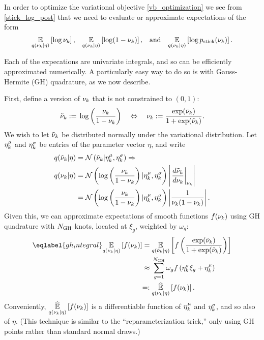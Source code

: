 In order to optimize the variational objective \eqref{vb_optimization} we see
from \eqref{stick_log_post} that we need to evaluate or approximate expectations
of the form
%
\begin{align*}
%
\expect{\q(\nuk \vert \eta)}{\log \nuk}
\textrm{,}\quad
\expect{\q(\nuk \vert \eta)}{\log (1 - \nuk)}
\textrm{,}\quad\textrm{and}\quad
\expect{\q(\nuk \vert \eta)}{\log \pstick(\nuk)}.
%
\end{align*}

Each of the expecations are univariate integrals, and so can be efficiently
approximated numerically.  A particularly easy way to do so is with
Gauss-Hermite (GH) quadrature, as we now describe.

First, define a version of $\nu_{k}$ that is not constrained to $(0,1)$:
%
\begin{align*}
%
\lnu_\k :={} \log \left( \frac{\nuk}{1 - \nuk} \right)
\quad\Leftrightarrow\quad
\nuk :={} \frac{\exp(\lnu_\k)}{1 + \exp(\lnu_\k)}.
%
\end{align*}
%
We wish to let $\tilde{\nu}_k$ be distributed normally under the variational
distribution.  Let $\eta^{\mu}_k$ and $\eta^{\sigma}_k$ be entries of the parameter
vector $\eta$, and write
%
\begin{align*}
%
\q(\lnu_\k \vert \eta) ={}& \normdist{\lnu_\k \vert \lnumean_\k, \lnusd_\k}
\Rightarrow \\
\q(\nuk \vert \eta) ={}&
    \normdist{\log \left( \frac{\nuk}{1 - \nuk} \right)
        \vert \lnumean_\k, \lnusd_\k}
    \left|\fracat{d \lnu_\k}{ d\nuk}{\nuk}\right|
\\={}&
\normdist{\log \left( \frac{\nuk}{1 - \nuk} \right)
        \vert \lnumean_\k, \lnusd_\k}
    \left|\frac{1}{\nuk (1 - \nuk)}\right|.
%
\end{align*}
%
Given this, we can approximate expectations of smooth functions
$f(\nu_{k})$ using GH quadrature with $N_{\mathrm{GH}}$ knots,
located at $\xi_g$, weighted by $\omega_g$:
%
\begin{align}\eqlabel{gh_integral}
%
\expect{\q(\nuk \vert \eta)}{f(\nuk)} ={}&
\expect{\q(\lnu_\k \vert \eta)}
       {f\left(\frac{\exp(\lnu_\k)}{1 + \exp(\lnu_\k)}\right)}
\nonumber\\\approx{}&
    \sum_{g=1}^{\ngh} \omega_g f\left(\lnusd_\k \xi_{g} + \lnumean_\k\right)
 \nonumber\\=:{}&
\expecthat{\q(\nuk \vert \eta)}{f(\nuk)}.
%
\end{align}
%
Conveniently, $\underset{q(\nu_{k} \vert \eta)}{\widehat{\mathbb{E}}}\left[f(\nu_{k})\right]$ is a differentiable
function of $\eta^{\mu}_k$ and $\eta^{\sigma}_k$, and so also of $\eta$.  (This
technique is similar to the ``reparameterization trick,'' only using
GH points rather than standard normal draws.)
